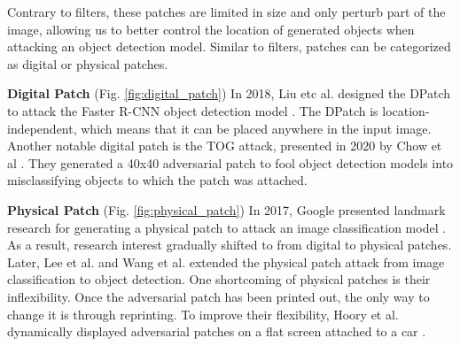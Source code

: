 Contrary to filters, these patches are limited in size and only perturb part of the image, allowing us to better control the location of generated objects when attacking an object detection model. Similar to filters, patches can be categorized as digital or physical patches.

\textbf{Digital Patch} (Fig. \ref{fig:digital_patch}) In 2018, Liu etc al. designed the DPatch \citep{liu2018dpatch} to attack the Faster R-CNN object detection model \citep{ren2015faster}. The DPatch is location-independent, which means that it can be placed anywhere in the input image. Another notable digital patch is the TOG attack, presented in 2020 by Chow et al \citep{chow2020adversarial}. They generated a 40x40 adversarial patch to fool object detection models into misclassifying objects to which the patch was attached.

\textbf{Physical Patch} (Fig. \ref{fig:physical_patch}) In 2017, Google presented landmark research for generating a physical patch to attack an image classification model \citep{brown2017patch}. As a result, research interest gradually shifted to from digital to physical patches. Later, Lee et al. \citep{lee2019physical} and Wang et al. \citep{wang2021daedalus} extended the physical patch attack from image classification to object detection. One shortcoming of physical patches is their inflexibility. Once the adversarial patch has been printed out, the only way to change it is through reprinting. To improve their flexibility, Hoory et al. dynamically displayed adversarial patches on a flat screen attached to a car \citep{hoory2020dynamic}.




